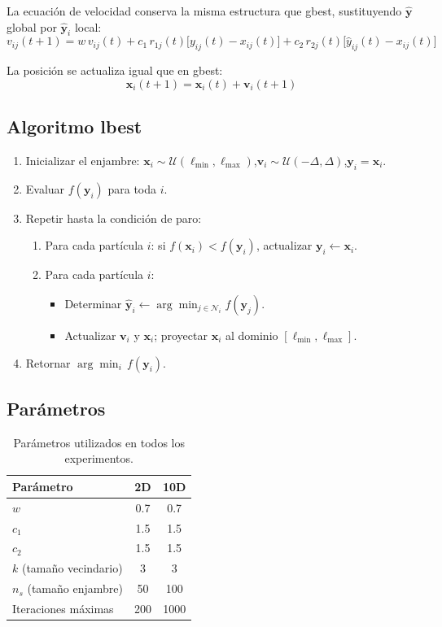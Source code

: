 \documentclass[11pt]{article}
\begin{document}
La ecuaci\'on de velocidad conserva la misma estructura que gbest, sustituyendo $\hat{\mathbf{y}}$ global por $\hat{\mathbf{y}}_i$ local:
\[
v_{ij}(t+1) = w\,v_{ij}(t)
  + c_1\,r_{1j}(t)\bigl[y_{ij}(t) - x_{ij}(t)\bigr]
  + c_2\,r_{2j}(t)\bigl[\hat{y}_{ij}(t) - x_{ij}(t)\bigr]
\]

La posici\'on se actualiza igual que en gbest:
\[
\mathbf{x}_i(t+1) = \mathbf{x}_i(t) + \mathbf{v}_i(t+1)
\]

\subsection{Algoritmo lbest}

\begin{enumerate}
    \item Inicializar el enjambre: $\mathbf{x}_i \sim \mathcal{U}(\ell_{\min},\ell_{\max})$,\quad $\mathbf{v}_i \sim \mathcal{U}(-\Delta,\Delta)$,\quad $\mathbf{y}_i = \mathbf{x}_i$.
    \item Evaluar $f(\mathbf{y}_i)$ para toda $i$.
    \item Repetir hasta la condici\'on de paro:
    \begin{enumerate}
        \item Para cada part\'icula $i$: si $f(\mathbf{x}_i) < f(\mathbf{y}_i)$, actualizar $\mathbf{y}_i \leftarrow \mathbf{x}_i$.
        \item Para cada part\'icula $i$:
        \begin{itemize}
            \item Determinar $\hat{\mathbf{y}}_i \leftarrow \arg\min_{j \in \mathcal{N}_i} f(\mathbf{y}_j)$.
            \item Actualizar $\mathbf{v}_i$ y $\mathbf{x}_i$; proyectar $\mathbf{x}_i$ al dominio $[\ell_{\min},\ell_{\max}]$.
        \end{itemize}
    \end{enumerate}
    \item Retornar $\arg\min_{i}\, f(\mathbf{y}_i)$.
\end{enumerate}

\subsection{Par\'ametros}

\begin{table}[H]
\centering
\begin{tabular}{lcc}
\hline\hline
Par\'ametro & 2D & 10D \\
\hline
$w$                       & 0.7  & 0.7  \\
$c_1$                     & 1.5  & 1.5  \\
$c_2$                     & 1.5  & 1.5  \\
$k$ (tama\~no vecindario) & 3    & 3    \\
$n_s$ (tama\~no enjambre) & 50   & 100  \\
Iteraciones m\'aximas     & 200  & 1000 \\
\hline\hline
\end{tabular}
\caption{Par\'ametros utilizados en todos los experimentos.}
\end{table}
\end{document}
